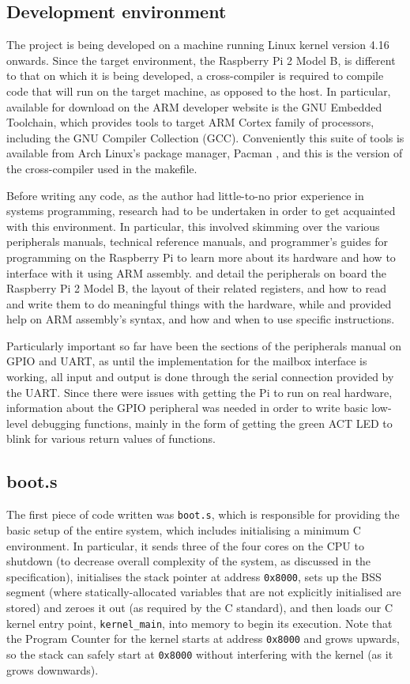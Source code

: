 \documentclass[10pt,a4paper]{article}
\newcommand{\code}[1]{\texttt{#1}}
\begin{document}
\subsection*{Development environment}
The project is being developed on a machine running Linux kernel version 4.16
onwards. Since the target environment, the Raspberry Pi 2 Model B, is different
to that on which it is being developed, a cross-compiler is required to compile
code that will run on the target machine, as opposed to the host. In particular,
available for download on the ARM developer website \cite{GNUtoolchain} is the
GNU Embedded Toolchain, which provides tools to target ARM Cortex family of
processors, including the GNU Compiler Collection (GCC). Conveniently this suite
of tools is available from Arch Linux's package manager, Pacman \cite{pacman},
and this is the version of the cross-compiler used in the makefile.

Before writing any code, as the author had little-to-no prior experience in
systems programming, research had to be undertaken in order to get acquainted
with this environment. In particular, this involved skimming over the various
peripherals manuals, technical reference manuals, and programmer's guides for
programming on the Raspberry Pi to learn more about its hardware and how to
interface with it using ARM assembly. \cite{BCM2835} and \cite{BCM2836} detail the
peripherals on board the Raspberry Pi 2 Model B, the layout of their related
registers, and how to read and write them to do meaningful things with the
hardware, while \cite{TRM} and \cite{PG} provided help on ARM assembly's syntax,
and how and when to use specific instructions.

Particularly important so far have been the sections of the peripherals manual
on GPIO and UART, as until the implementation for the mailbox interface is
working, all input and output is done through the serial connection provided by
the UART.  Since there were issues with getting the Pi to run on real hardware,
information about the GPIO peripheral was needed in order to write basic
low-level debugging functions, mainly in the form of getting the green ACT LED
to blink for various return values of functions.

\subsection*{boot.s}
The first piece of code written was \code{boot.s}, which is responsible for
providing the basic setup of the entire system, which includes initialising a
minimum C environment. In particular, it sends three of the four cores on the
CPU to shutdown (to decrease overall complexity of the system, as discussed in
the specification), initialises the stack pointer at address \code{0x8000}, sets
up the BSS segment (where statically-allocated variables that are not explicitly
initialised are stored) and zeroes it out (as required by the C standard), and
then loads our C kernel entry point, \code{kernel\_main}, into memory to begin
its execution. Note that the Program Counter for the kernel starts at address
\code{0x8000} and grows upwards, so the stack can safely start at \code{0x8000}
without interfering with the kernel (as it grows downwards).
\end{document}
